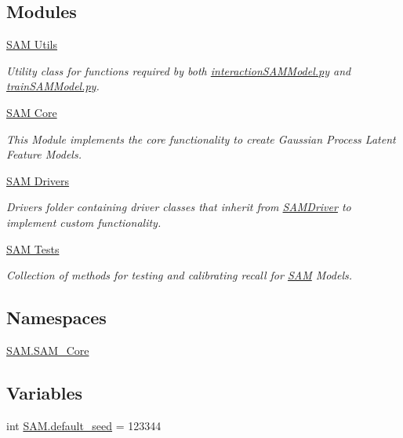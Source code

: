 \subsection*{Modules}
\begin{DoxyCompactItemize}
\item 
\hyperlink{group__icubclient__SAM__utils}{S\+A\+M Utils}
\begin{DoxyCompactList}\small\item\em Utility class for functions required by both \hyperlink{interactionSAMModel_8py}{interaction\+S\+A\+M\+Model.\+py} and \hyperlink{trainSAMModel_8py}{train\+S\+A\+M\+Model.\+py}. \end{DoxyCompactList}\item 
\hyperlink{group__icubclient__SAM__Core}{S\+A\+M Core}
\begin{DoxyCompactList}\small\item\em This Module implements the core functionality to create Gaussian Process Latent Feature Models. \end{DoxyCompactList}\item 
\hyperlink{group__icubclient__SAM__Drivers}{S\+A\+M Drivers}
\begin{DoxyCompactList}\small\item\em Drivers folder containing driver classes that inherit from \hyperlink{group__icubclient__SAM__Drivers_classSAM_1_1SAM__Core_1_1SAMDriver_1_1SAMDriver}{S\+A\+M\+Driver} to implement custom functionality. \end{DoxyCompactList}\item 
\hyperlink{group__icubclient__SAM__Tests}{S\+A\+M Tests}
\begin{DoxyCompactList}\small\item\em Collection of methods for testing and calibrating recall for \hyperlink{namespaceSAM}{S\+AM} Models. \end{DoxyCompactList}\end{DoxyCompactItemize}
\subsection*{Namespaces}
\begin{DoxyCompactItemize}
\item 
 \hyperlink{namespaceSAM_1_1SAM__Core}{S\+A\+M.\+S\+A\+M\+\_\+\+Core}
\end{DoxyCompactItemize}
\subsection*{Variables}
\begin{DoxyCompactItemize}
\item 
int \hyperlink{group__icubclient__SAM__source_ga161f34370db931f9dc1648dddb17f44b}{S\+A\+M.\+default\+\_\+seed} = 123344
\end{DoxyCompactItemize}


